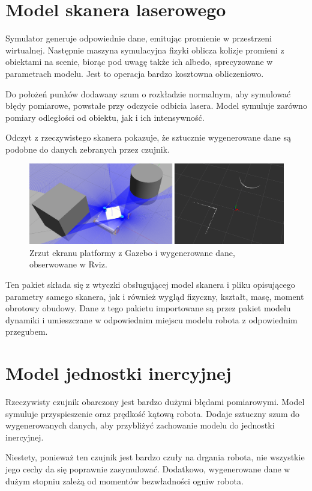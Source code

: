 \section{Model skanera laserowego}
	\label{sec:monokl}
	Symulator generuje odpowiednie dane, emitując promienie w przestrzeni wirtualnej.
	Następnie maszyna symulacyjna fizyki oblicza kolizje promieni z obiektami na scenie, biorąc pod uwagę także ich albedo, sprecyzowane w parametrach modelu. 
	Jest to operacja bardzo kosztowna obliczeniowo.
	
	Do położeń punków dodawany szum o rozkładzie normalnym, aby symulować błędy pomiarowe, powstałe przy odczycie odbicia lasera.
	Model symuluje zarówno pomiary odległości od obiektu, jak i ich intensywność.
	
	Odczyt z rzeczywistego skanera pokazuje, że sztucznie wygenerowane dane są podobne do danych zebranych przez czujnik.

	\begin{figure}[h]
	\centering
	\includegraphics[width=\textwidth]{graphics/scan.png}
	\caption{Zrzut ekranu platformy z Gazebo i wygenerowane dane, obserwowane w Rviz.}
	\label{fig:scan}
	\end{figure}
	
	Ten pakiet składa się z wtyczki obsługującej model skanera i pliku opisującego parametry samego skanera, jak i również wygląd fizyczny, kształt, masę, moment obrotowy obudowy.
	Dane z tego pakietu importowane są przez pakiet modelu dynamiki i umieszczane w odpowiednim miejscu modelu robota z odpowiednim przegubem.
	
\section{Model jednostki inercyjnej}
	Rzeczywisty czujnik obarczony jest bardzo dużymi błędami pomiarowymi.
	Model symuluje przyspieszenie oraz prędkość kątową robota.
	Dodaje sztuczny szum do wygenerowanych danych, aby przybliżyć zachowanie modelu do jednostki inercyjnej.
	
	Niestety, ponieważ ten czujnik jest bardzo czuły na drgania robota, nie wszystkie jego cechy da się poprawnie zasymulować.
	Dodatkowo, wygenerowane dane w dużym stopniu zależą od momentów bezwładności ogniw robota.
	
